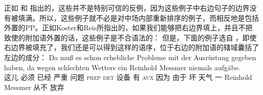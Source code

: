 \begin{enumerate}
{%
\zl
	正如 \citet[\S~6]{Koster75a}和 \citet*[]{Reis80a} 指出的，这些并不是特别可信的反例，因为这些例子中右边句子的边界没有被填满。所以，这些例子就不必是对中场内部重新排序的例子，而相反地是包括外置的PP。正如Koster和Reis所指出的，如果我们能够把右边界填上，并且不把致使的附加语外置的话，这些例子是不合语法的：
\eal
{}
\zl
但是，下面的例子选自 \citet[]{Crysmann2004a} ，即使右边界被填充了，我们还是可以得到这样的语序，位于右边的附加语的辖域囊括了左边的成分：
\ea
\gll Da muß es schon erhebliche Probleme mit der Ausrüstung gegeben haben, da wegen schlechten
  Wetters ein Reinhold Messmer niemals aufgäbe.\\
  这儿 必须 \expl{} 已经 严重 问题 \textsc{prep} \textsc{det} 设备 有 \textsc{aux} 因为 由于 坏 天气 一 Reinhold Messmer 从不
  放弃\\
}
\end{enumerate}

